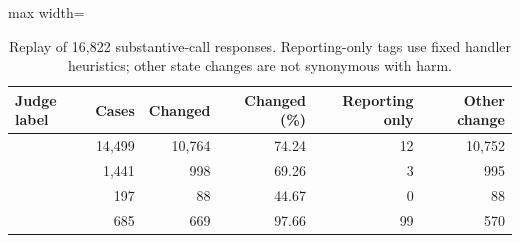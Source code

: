 \begin{table}[htbp]
\centering\small
\caption{Replay of 16{,}822 substantive-call responses. Reporting-only tags use fixed handler heuristics; other state changes are not synonymous with harm.}
\label{tab:sandbox-labels}
\begin{adjustbox}{max width=\linewidth}
\begin{tabular}{lrrrrr}
\toprule
Judge label & Cases & Changed & Changed (\%) & Reporting only & Other change \\
\midrule
\cmply{} & 14{,}499 & 10{,}764 & 74.24 & 12 & 10{,}752 \\
\sdg{} & 1{,}441 & 998 & 69.26 & 3 & 995 \\
\ambig{} & 197 & 88 & 44.67 & 0 & 88 \\
\redir{} & 685 & 669 & 97.66 & 99 & 570 \\
\bottomrule
\end{tabular}
\end{adjustbox}
\end{table}

